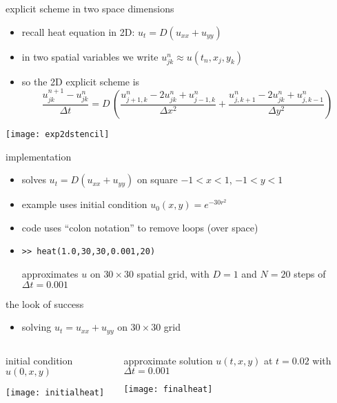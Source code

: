 \begin{frame}{explicit scheme in two space dimensions}

\begin{itemize}
\item recall heat equation in 2D: $u_t = D(u_{xx} + u_{yy})$
\item in two spatial variables we write $u_{jk}^n \approx u(t_n,x_j,y_k)$
\item so the 2D explicit scheme is
\small
	$$\frac{u_{jk}^{n+1} - u_{jk}^n}{\Delta t} = D\,\left(\frac{u_{j+1,k}^n - 2 u_{jk}^n + u_{j-1,k}^n}{\Delta x^2} + \frac{u_{j,k+1}^n - 2 u_{jk}^n + u_{j,k-1}^n}{\Delta y^2}\right)$$
\end{itemize}

\bigskip
\begin{center}
\texttt{[image: exp2dstencil]}
\end{center}
\end{frame}


\begin{frame}{implementation}
\label{slide:heatmatlab}


\small
\begin{itemize}
\item solves $u_t = D(u_{xx} + u_{yy})$ on square $-1 < x < 1$, $-1 < y < 1$
\item example uses initial condition $u_0(x,y) = e^{-30 r^2}$
\item code uses ``colon notation'' to remove loops (over space)
\item \texttt{>>  heat(1.0,30,30,0.001,20)}

approximates $u$ on $30\times 30$ spatial grid, with $D=1$ and $N=20$ steps of $\Delta t = 0.001$
\end{itemize}
\end{frame}


\begin{frame}{the look of success}

\begin{itemize}
\item solving $u_t = u_{xx} + u_{yy}$ on $30\times 30$ grid
\end{itemize}

\bigskip\bigskip
\begin{columns}
\begin{column}{0.5\textwidth}
initial condition $u(0,x,y)$

\bigskip
\begin{center}
\texttt{[image: initialheat]}
\end{center}
\end{column}
\begin{column}{0.5\textwidth}
approximate solution $u(t,x,y)$ at $t=0.02$ with $\Delta t=0.001$ 

\bigskip
\begin{center}
\texttt{[image: finalheat]}
\end{center}
\end{column}
\end{columns}
\end{frame}


